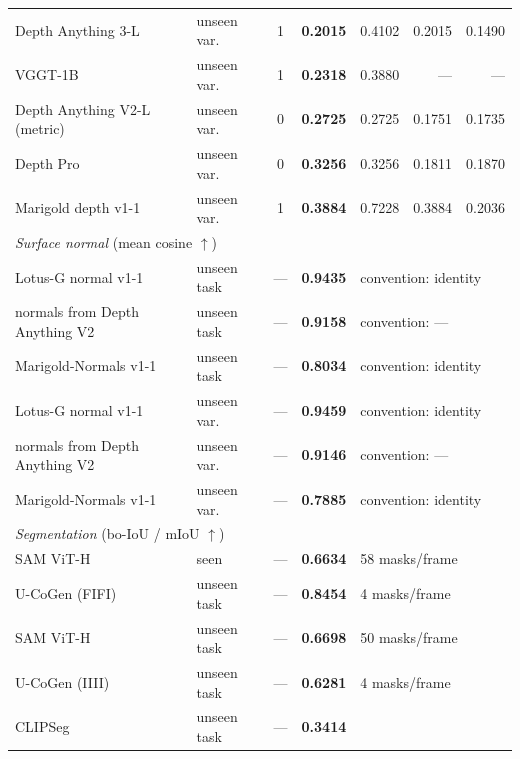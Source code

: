 \begin{table}[h]
\begin{tabular}{llcrrrr}
Depth Anything 3-L \citep{lin2025depthanything3} & unseen var. & 1 & \textbf{0.2015} & 0.4102 & 0.2015 & 0.1490 \\
VGGT-1B \citep{wang2025vggt} & unseen var. & 1 & \textbf{0.2318} & 0.3880 & --- & --- \\
Depth Anything V2-L (metric) \citep{yang2024depthanythingv2} & unseen var. & 0 & \textbf{0.2725} & 0.2725 & 0.1751 & 0.1735 \\
Depth Pro \citep{bochkovskii2024depthpro} & unseen var. & 0 & \textbf{0.3256} & 0.3256 & 0.1811 & 0.1870 \\
Marigold depth v1-1 \citep{ke2024marigold} & unseen var. & 1 & \textbf{0.3884} & 0.7228 & 0.3884 & 0.2036 \\
\midrule
\multicolumn{7}{l}{\emph{Surface normal} (mean cosine $\uparrow$)} \\
Lotus-G normal v1-1 \citep{he2025lotus} & unseen task & --- & \textbf{0.9435} & \multicolumn{3}{l}{convention: identity} \\
normals from Depth Anything V2 \citep{yang2024depthanythingv2} & unseen task & --- & \textbf{0.9158} & \multicolumn{3}{l}{convention: ---} \\
Marigold-Normals v1-1 \citep{ke2024marigold} & unseen task & --- & \textbf{0.8034} & \multicolumn{3}{l}{convention: identity} \\
Lotus-G normal v1-1 \citep{he2025lotus} & unseen var. & --- & \textbf{0.9459} & \multicolumn{3}{l}{convention: identity} \\
normals from Depth Anything V2 \citep{yang2024depthanythingv2} & unseen var. & --- & \textbf{0.9146} & \multicolumn{3}{l}{convention: ---} \\
Marigold-Normals v1-1 \citep{ke2024marigold} & unseen var. & --- & \textbf{0.7885} & \multicolumn{3}{l}{convention: identity} \\
\midrule
\multicolumn{7}{l}{\emph{Segmentation} (bo-IoU / mIoU $\uparrow$)} \\
SAM ViT-H \citep{kirillov2023sam} & seen & --- & \textbf{0.6634} & \multicolumn{3}{l}{58 masks/frame} \\
U-CoGen (FIFI) & unseen task & --- & \textbf{0.8454} & \multicolumn{3}{l}{4 masks/frame} \\
SAM ViT-H \citep{kirillov2023sam} & unseen task & --- & \textbf{0.6698} & \multicolumn{3}{l}{50 masks/frame} \\
U-CoGen (IIII) & unseen task & --- & \textbf{0.6281} & \multicolumn{3}{l}{4 masks/frame} \\
CLIPSeg \citep{luddecke2022clipseg} & unseen task & --- & \textbf{0.3414} & \multicolumn{3}{l}{} \\

\end{tabular}
\end{table}
